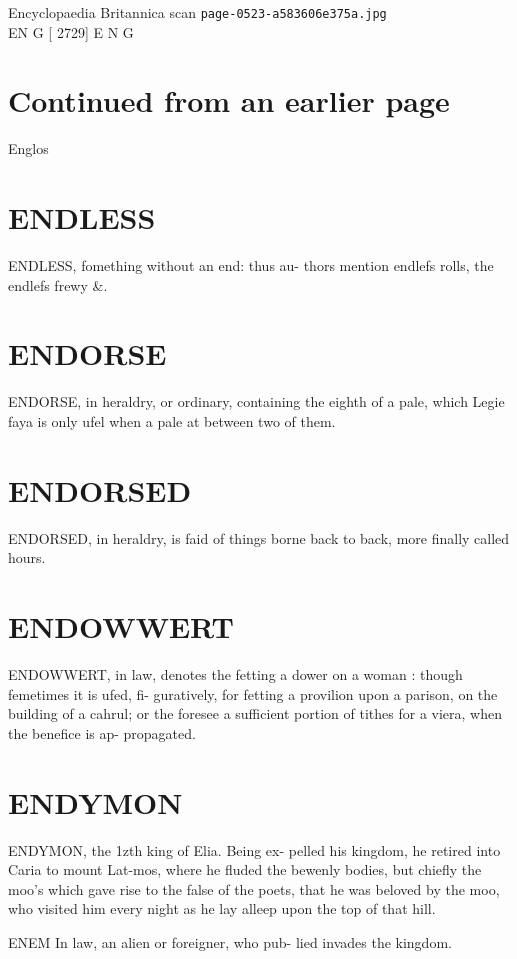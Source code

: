 \documentclass{article}
\begin{document}
\begin{center}
{\Large Encyclopaedia Britannica scan \texttt{page-0523-a583606e375a.jpg}}\\[0.5em]
EN G [ 2729] E N G
\end{center}
\section*{Continued from an earlier page}
Englos

\section*{ENDLESS}
ENDLESS, fomething without an end: thus au- thors mention endlefs rolls, the endlefs frewy \&.

\section*{ENDORSE}
ENDORSE, in heraldry, or ordinary, containing the eighth of a pale, which Legie faya is only ufel when a pale at between two of them.

\section*{ENDORSED}
ENDORSED, in heraldry, is faid of things borne back to back, more finally called hours.

\section*{ENDOWWERT}
ENDOWWERT, in law, denotes the fetting a dower on a woman : though femetimes it is ufed, fi- guratively, for fetting a provilion upon a parison, on the building of a cahrul; or the foresee a sufficient portion of tithes for a viera, when the benefice is ap- propagated.

\section*{ENDYMON}
ENDYMON, the 1zth king of Elia. Being ex- pelled his kingdom, he retired into Caria to mount Lat-mos, where he fluded the bewenly bodies, but chiefly the moo's which gave rise to the false of the poets, that he was beloved by the moo, who visited him every night as he lay alleep upon the top of that hill.

ENEM In law, an alien or foreigner, who pub- lied invades the kingdom.
\end{document}
